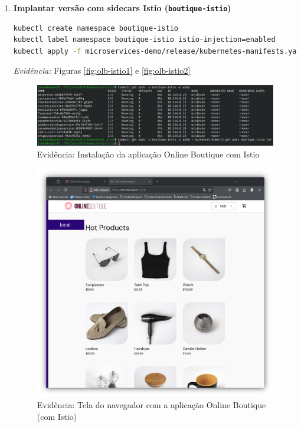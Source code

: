\documentclass[9pt,a4paper,twocolumn,twoside]{tau-class/tau}
\begin{document}
\begin{enumerate}[label=\arabic*.]
\item\textbf{Implantar versão com sidecars Istio (\texttt{boutique-istio})}
\begin{lstlisting}[language=Bash]
kubectl create namespace boutique-istio
kubectl label namespace boutique-istio istio-injection=enabled
kubectl apply -f microservices-demo/release/kubernetes-manifests.yaml -n boutique-istio
\end{lstlisting}
\textit{Evidência:} Figuras \ref{fig:olb-istio1} e \ref{fig:olb-istio2}\\

\begin{figure}[h]
    \centering
    \includegraphics[width=1\linewidth]{figures/evidence-olbistio2.png}
    \caption{Evidência: Instalação da aplicação Online Boutique com Istio}
    \label{fig:olb-base1}
\end{figure}

\begin{figure}[h]
    \centering
    \includegraphics[width=1\linewidth]{figures/evidence-olbistio3.png}
    \caption{Evidência: Tela do navegador com a aplicação Online Boutique (com Istio)}
    \label{fig:olb-base2}
\end{figure}
\end{enumerate}
\end{document}
